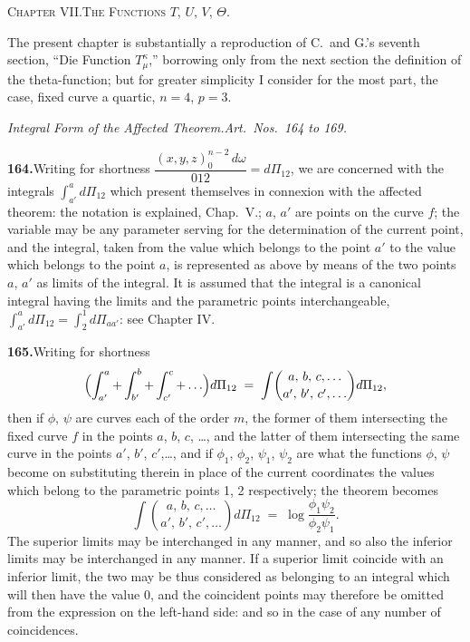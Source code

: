 \documentclass[11pt]{article}
\begin{document}
\begin{center}
{\large\scshape Chapter VII.\quad The Functions $T$, $U$, $V$, $\Theta$.}
\end{center}
\vspace{0.4em}

\noindent
The present chapter is substantially a reproduction of C.\ and G.'s seventh section,
``Die Function $T_{\mu}^{\kappa}$,'' borrowing only from the next section the definition of the
theta-function; but for greater simplicity I consider for the most part, the case, fixed
curve a quartic, $n=4$, $p=3$.

\bigskip
\begin{center}
\textit{Integral Form of the Affected Theorem.\quad Art.\ Nos.\ 164 to 169.}
\end{center}

\textbf{164.}\quad Writing for shortness $\dfrac{(x,y,z)_{0}^{n-2}\,d\omega}{012}=d\Pi_{12}$, we are concerned with the integrals
$\displaystyle\int_{a'}^{a}d\Pi_{12}$ which present themselves in connexion with the affected theorem: the notation
is explained, Chap.~V.; $a$, $a'$ are points on the curve $f$; the variable may be any
parameter serving for the determination of the current point, and the integral, taken
from the value which belongs to the point $a'$ to the value which belongs to the
point $a$, is represented as above by means of the two points $a$, $a'$ as limits of the
integral.  It is assumed that the integral is a canonical integral having the limits and
the parametric points interchangeable, $\displaystyle\int_{a'}^{a}d\Pi_{12} = \int_{2}^{1}d\Pi_{aa'}$: see Chapter IV.

\medskip
\textbf{165.}\quad Writing for shortness
\[
\Bigl(\int_{a'}^{a}+\int_{b'}^{b}+\int_{c'}^{c}+\ldots\Bigr)d\Pi_{12}
   \;=\;\int\!\binom{a,\,b,\,c,\ldots}{a',\,b',\,c',\ldots}d\Pi_{12},
\]
then if $\phi$, $\psi$ are curves each of the order $m$, the former of them intersecting the
fixed curve $f$ in the points $a$, $b$, $c$, \ldots, and the latter of them intersecting the same
curve in the points $a'$, $b'$, $c'$,\ldots, and if $\phi_{1}$, $\phi_{2}$, $\psi_{1}$, $\psi_{2}$ are what the functions $\phi$, $\psi$
become on substituting therein in place of the current coordinates the values which
belong to the parametric points 1, 2 respectively; the theorem becomes
\[
\int\!\binom{a,\,b,\,c,\ldots}{a',\,b',\,c',\ldots}d\Pi_{12} \;=\; \log\frac{\phi_{1}\psi_{2}}{\phi_{2}\psi_{1}}.
\]
The superior limits may be interchanged in any manner, and so also the inferior
limits may be interchanged in any manner.  If a superior limit coincide with an
inferior limit, the two may be thus considered as belonging to an integral which
will then have the value $0$, and the coincident points may therefore be omitted from
the expression on the left-hand side: and so in the case of any number of coincidences.
\end{document}
